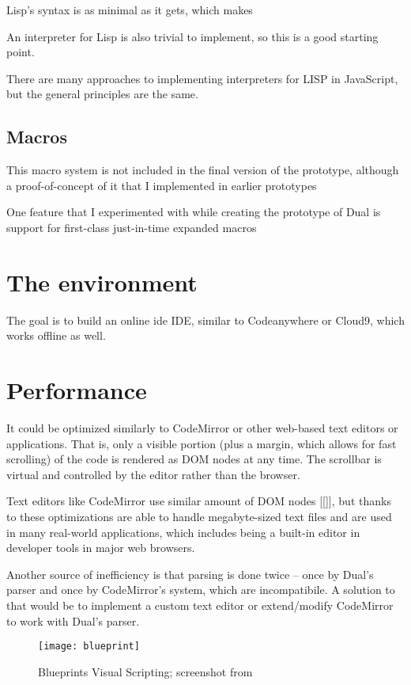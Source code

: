 Lisp's syntax is as minimal as it gets\cite{syntaxation}, which makes 

An interpreter for Lisp is also trivial to implement, so this is a good starting
point.

There are many approaches to implementing interpreters for LISP in
JavaScript\cite{js_lisps}, but the general principles are the same.

\subsection{Macros}
This
macro system is not included in the final version of the prototype, although a
proof-of-concept of it that I implemented in earlier prototypes


One feature that I experimented with while creating the prototype of Dual is
support for first-class just-in-time expanded macros

\section{The environment}

The goal is to build an online \acrlong{ide} IDE, similar to
Codeanywhere\cite{codeanywhere_website} or
Cloud9\cite{c9_website}, which works offline as well.

\section{Performance}
It could be optimized similarly to CodeMirror or other web-based text editors or
applications. That is, only a visible portion (plus a margin, which allows for
fast scrolling) of the code is rendered as DOM nodes at any time. The scrollbar
is virtual and controlled by the editor rather than the browser.

Text editors like CodeMirror use similar amount of DOM nodes [[]], but thanks to
these optimizations are able to handle
megabyte-sized\cite[Section~General Approach]{cm_internals}
text files and are used in many real-world
applications\cite{cm_realworld}, which
includes being a built-in editor in developer tools in major web browsers.

Another source of inefficiency is that parsing is done twice -- once by Dual's
parser and once by CodeMirror's system, which are incompatibile.  A solution to
that would be to implement a custom text editor or extend/modify CodeMirror to
work with Dual's parser.


\begin{figure}[h!]
\centering \texttt{[image: blueprint]}
\caption{
    Blueprints Visual Scripting;
    screenshot from \protect\cite{fig_blueprint2}
}
\label{fig:blueprint2}
\end{figure}


